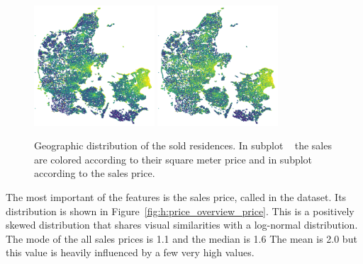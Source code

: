 \begin{figure}
  \centering
  \subfloat[\label{fig:h:geo_overview_sqm_price}]{\,}
  \includegraphics[draft=false, width=0.4\textwidth]{figures/housing/Denmark_Overview_SqmPrice.png}\hfil
  \subfloat[\label{fig:h:geo_overview_sales_price}]{\,}
  \includegraphics[draft=false, width=0.4\textwidth]{figures/housing/Denmark_Overview_SalesPrice.png}
  \caption[Geographic Distribution of the Sold Residences]{Geographic distribution of the sold residences. 
           In subplot ~\protect{} the sales are colored according to their square meter price and in subplot ~\protect{} according to the sales price. 
           }
  \label{fig:h:geo_overview}
  \vspace{\abovecaptionskip}
\end{figure}

The most important of the features is the sales price, called  in the dataset. Its distribution is shown in Figure~\ref{fig:h:price_overview_price}. This is a positively skewed distribution that shares visual similarities with a log-normal distribution. The mode of the all sales prices is \SI{1.1}{\Mkr} and the median is \SI{1.6}{\Mkr} The mean is \SI{2.0}{\Mkr} but this value is heavily influenced by a few very high values. 

